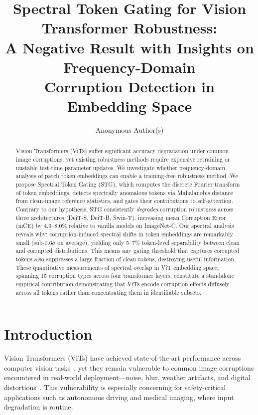 \documentclass{article}
\title{Spectral Token Gating for Vision Transformer Robustness:\\A Negative Result with Insights on Frequency-Domain\\Corruption Detection in Embedding Space}
\author{
  Anonymous Author(s)
}
\begin{document}
\maketitle

\begin{abstract}
Vision Transformers (ViTs) suffer significant accuracy degradation under common image corruptions, yet existing robustness methods require expensive retraining or unstable test-time parameter updates. We investigate whether frequency-domain analysis of patch token embeddings can enable a training-free robustness method. We propose Spectral Token Gating (STG), which computes the discrete Fourier transform of token embeddings, detects spectrally anomalous tokens via Mahalanobis distance from clean-image reference statistics, and gates their contributions to self-attention. Contrary to our hypothesis, STG consistently \emph{degrades} corruption robustness across three architectures (DeiT-S, DeiT-B, Swin-T), increasing mean Corruption Error (mCE) by 4.9--8.0\% relative to vanilla models on ImageNet-C. Our spectral analysis reveals why: corruption-induced spectral shifts in token embeddings are remarkably small (sub-0.6$\sigma$ on average), yielding only 5--7\% token-level separability between clean and corrupted distributions. This means any gating threshold that captures corrupted tokens also suppresses a large fraction of clean tokens, destroying useful information. These quantitative measurements of spectral overlap in ViT embedding space, spanning 15 corruption types across four transformer layers, constitute a standalone empirical contribution demonstrating that ViTs encode corruption effects diffusely across all tokens rather than concentrating them in identifiable subsets.
\end{abstract}

\section{Introduction}

Vision Transformers (ViTs) have achieved state-of-the-art performance across computer vision tasks~\citep{dosovitskiy2021image, liu2021swin, touvron2021training}, yet they remain vulnerable to common image corruptions encountered in real-world deployment---noise, blur, weather artifacts, and digital distortions~\citep{hendrycks2019benchmarking}. This vulnerability is especially concerning for safety-critical applications such as autonomous driving and medical imaging, where input degradation is routine.
\end{document}
